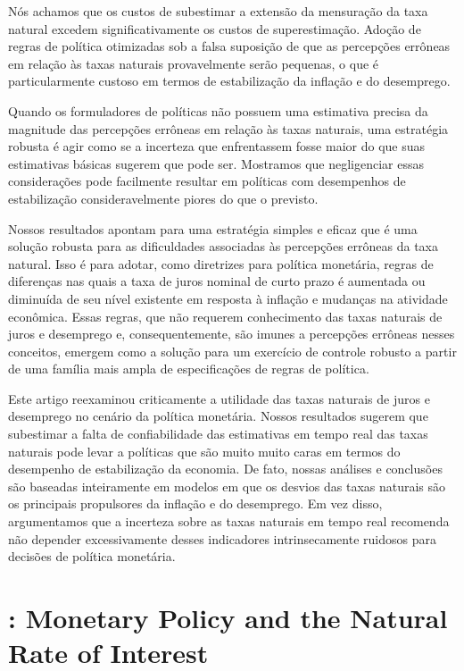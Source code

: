 \documentclass[11pt,oneside,a4paper]{article}
\begin{document}
Nós achamos que os custos de subestimar a extensão da mensuração da taxa natural excedem significativamente os custos de superestimação. Adoção de regras de política otimizadas sob a falsa suposição de que as percepções errôneas em relação às taxas naturais provavelmente serão pequenas, o que é particularmente custoso em termos de estabilização da inflação e do desemprego.

Quando os formuladores de políticas não possuem uma estimativa precisa da magnitude das percepções errôneas em relação às taxas naturais, uma estratégia robusta é agir como se a incerteza que enfrentassem fosse maior do que suas estimativas básicas sugerem que pode ser. Mostramos que negligenciar essas considerações pode facilmente resultar em políticas com desempenhos de estabilização consideravelmente piores do que o previsto.

Nossos resultados apontam para uma estratégia simples e eficaz que é uma solução robusta para as dificuldades associadas às percepções errôneas da taxa natural. Isso é para adotar, como diretrizes para política monetária, regras de diferenças nas quais a taxa de juros nominal de curto prazo é aumentada ou diminuída de seu nível existente em resposta à inflação e mudanças na atividade econômica. Essas regras, que não requerem conhecimento das taxas naturais de juros e desemprego e, consequentemente, são imunes a percepções errôneas nesses conceitos, emergem como a solução para um exercício de controle robusto a partir de uma família mais ampla de especificações de regras de política.

Este artigo reexaminou criticamente a utilidade das taxas naturais de juros e desemprego no cenário da política monetária. Nossos resultados sugerem que subestimar a falta de confiabilidade das estimativas em tempo real das taxas naturais pode levar a políticas que são muito muito caras em termos do desempenho de estabilização da economia. De fato, nossas análises e conclusões são baseadas inteiramente em modelos em que os desvios das taxas naturais são os principais propulsores da inflação e do desemprego. Em vez disso, argumentamos que a incerteza sobre as taxas naturais em tempo real recomenda não depender excessivamente desses indicadores intrinsecamente ruidosos para decisões de política monetária.
%
%
\section{\citet{Canzoneri:2015}: Monetary Policy and the Natural Rate of Interest}
\end{document}
